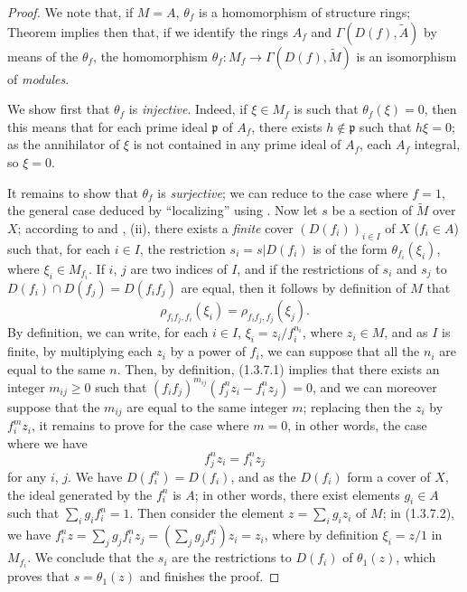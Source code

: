 \begin{proof}
\label{proof-1.1.3.7}
We note that, if $M=A$, $\theta_f$ is a homomorphism of structure rings; Theorem
 implies then that, if we identify the rings $A_f$ and
$\Gamma(D(f),\widetilde{A})$ by means of the $\theta_f$, the homomorphism
$\theta_f:M_f\to\Gamma(D(f),\widetilde{M})$ is an isomorphism of {\em modules}.

We show first that $\theta_f$ is {\em injective}. Indeed, if $\xi\in M_f$ is such that
$\theta_f(\xi)=0$, then this means that for each prime ideal $\mathfrak{p}$ of $A_f$, there
exists $h\not\in\mathfrak{p}$ such that $h\xi=0$; as the annihilator of $\xi$ is not
contained in any prime ideal of $A_f$, each $A_f$ integral, so $\xi=0$.

It remains to show that $\theta_f$ is {\em surjective}; we can reduce to the case where
$f=1$, the general case deduced by ``localizing'' using . Now let $s$ be a
section of $\widetilde{M}$ over $X$; according to  and
, (ii), there exists a {\em finite} cover $(D(f_i))_{i\in I}$ of $X$
($f_i\in A$) such that, for each $i\in I$, the restriction $s_i=s|D(f_i)$ is of the form
$\theta_{f_i}(\xi_i)$, where $\xi_i\in M_{f_i}$. If $i$, $j$ are two indices of $I$, and if
the restrictions of $s_i$ and $s_j$ to $D(f_i)\cap D(f_j)=D(f_i f_j)$ are equal, then
it follows by definition of $M$ that
\[
  \rho_{f_i f_j,f_i}(\xi_i)=\rho_{f_i f_j,f_j}(\xi_j).
  \tag{1.3.7.1}
\]
By definition, we can write, for each $i\in I$, $\xi_i=z_i/f_i^{n_i}$, where $z_i\in M$, and
as $I$ is finite, by multiplying each $z_i$ by a power of $f_i$, we can suppose that all the
$n_i$ are equal to the same $n$. Then, by definition, (1.3.7.1) implies that there exists an
integer $m_{ij}\geqslant 0$ such that $(f_i f_j)^{m_{ij}}(f_j^n z_i-f_i^n z_j)=0$, and we can
moreover suppose that the $m_{ij}$ are equal to the same integer $m$; replacing then the
$z_i$ by $f_i^m z_i$, it remains to prove for the case where $m=0$, in other words, the case
where we have
\[
  f_j^n z_i=f_i^n z_j
  \tag{1.3.7.2}
\]
for any $i$, $j$. We have $D(f_i^n)=D(f_i)$, and as the $D(f_i)$ form a cover of $X$,
the ideal generated by the $f_i^n$ is $A$; in other words, there exist elements $g_i\in A$
such that $\sum_i g_i f_i^n=1$. Then consider the element $z=\sum_i g_i z_i$ of $M$; in
(1.3.7.2), we have $f_i^n z=\sum_j g_j f_i^n z_j=(\sum_j g_j f_j^n)z_i=z_i$, where by
definition $\xi_i=z/1$ in $M_{f_i}$. We conclude
that the $s_i$ are the restrictions to $D(f_i)$ of $\theta_1(z)$, which proves that
$s=\theta_1(z)$ and finishes the proof.
\end{proof}

